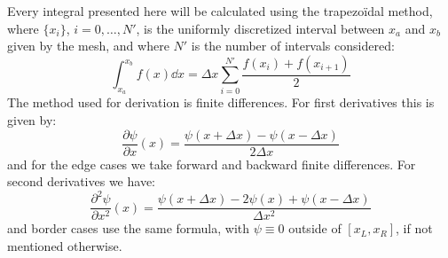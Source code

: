 Every integral presented here will be calculated using the trapezoïdal method, where \(\{x_i\}\), \(i = 0, \dots, N'\), is the uniformly discretized interval between \(x_a\) and \(x_b\) given by the mesh, and where \(N'\) is the number of intervals considered:
\begin{equation}
    \int_{x_a}^{x_b} f(x) \dd x = \Delta x \sum_{i=0}^{N'} \frac{f(x_i) + f(x_{i+1})}{2}
\end{equation}
The method used for derivation is finite differences. For first derivatives this is given by:
\begin{equation}
    \frac{\partial \psi}{\partial x}(x) = \frac{\psi(x+\Delta x) - \psi(x - \Delta x)}{2\Delta x}
\end{equation}
and for the edge cases we take forward and backward finite differences. For second derivatives we have:
\begin{equation}
    \frac{\partial^2 \psi}{\partial x^2}(x) = \frac{\psi(x+\Delta x) - 2\psi(x) + \psi(x - \Delta x)}{\Delta x^2}
    \label{eq:second_derivative}
\end{equation}
and border cases use the same formula, with $\psi \equiv 0$ outside of $[x_L,x_R]$, if not mentioned otherwise.

